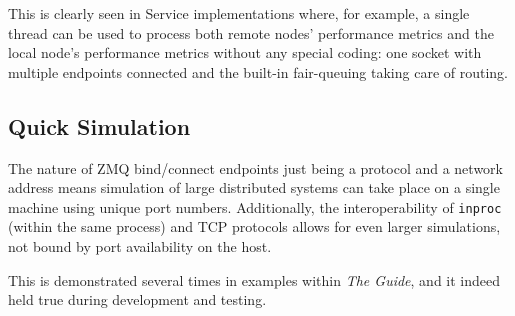 This is clearly seen in \dcamp Service implementations where, for example, a single thread can be used to process both
remote nodes' performance metrics and the local node's performance metrics without any special coding: one socket with
multiple endpoints connected and the built-in fair-queuing taking care of routing.

\subsection{Quick Simulation}

The nature of ZMQ bind/connect endpoints just being a protocol and a network address means simulation of large
distributed systems can take place on a single machine using unique port numbers. Additionally, the interoperability of
\texttt{inproc} (within the same process) and TCP protocols allows for even larger simulations, not bound by port
availability on the host.

This is demonstrated several times in examples within \textit{The Guide}, and it indeed held true during \dcamp
development and testing.
